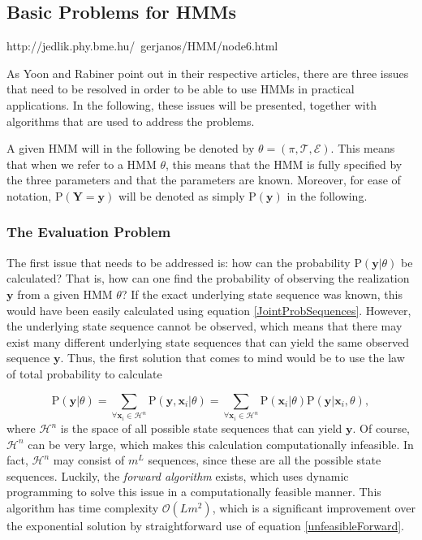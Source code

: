 \documentclass{article}
\begin{document}
\subsection{Basic Problems for HMMs}
http://jedlik.phy.bme.hu/~gerjanos/HMM/node6.html

As Yoon \cite{Yoon2009} and Rabiner \cite{Rabiner1989} point out in their respective articles, there are three issues that need to be resolved in order to be able to use HMMs in practical applications. In the following, these issues will be presented, together with algorithms that are used to address the problems. 

A given HMM will in the following be denoted by $\theta = (\pi, \mathcal{T}, \mathcal{E})$. This means that when we refer to a HMM $\theta$, this means that the HMM is fully specified by the three parameters and that the parameters are known. Moreover, for ease of notation, $\text{P}(\mathbf{Y} = \mathbf{y})$ will be denoted as simply $\text{P}(\mathbf{y})$ in the following. 

\subsubsection{The Evaluation Problem}
The first issue that needs to be addressed is: how can the probability $\text{P}(\mathbf{y}|\theta)$ be calculated? That is, how can one find the probability of observing the realization $\mathbf{y}$ from a given HMM $\theta$? If the exact underlying state sequence was known, this would have been easily calculated using equation \eqref{JointProbSequences}. However, the underlying state sequence cannot be observed, which means that there may exist many different underlying state sequences that can yield the same observed sequence $\mathbf{y}$. Thus, the first solution that comes to mind would be to use the law of total probability to calculate

\begin{equation}
    \text{P}(\textbf{y}|\theta) = \sum_{\forall\textbf{x}_i \in \mathcal{H}^n} \text{P}(\textbf{y}, \textbf{x}_i|\theta) = \sum_{\forall\textbf{x}_i \in \mathcal{H}^n} \text{P}(\mathbf{x}_i|\theta)\text{P}(\mathbf{y}|\mathbf{x}_i,\theta), 
\label{unfeasibleForward}
\end{equation}
where $\mathcal{H}^n$ is the space of all possible state sequences that can yield $\mathbf{y}$. Of course, $\mathcal{H}^n$ can be very large, which makes this calculation computationally infeasible. In fact, $\mathcal{H}^n$ may consist of $m^L$ sequences, since these are all the possible state sequences. Luckily, the \textit{forward algorithm} exists, which uses dynamic programming to solve this issue in a computationally feasible manner. This algorithm has time complexity $\mathcal{O}(Lm^2)$, which is a significant improvement over the exponential solution by straightforward use of equation \eqref{unfeasibleForward}. 
\end{document}
